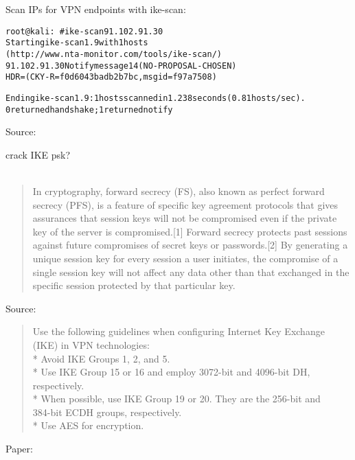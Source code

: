 \documentclass[Screen16to9,17pt]{foils}
\begin{document}
Scan IPs for VPN endpoints with ike-scan:
\begin{alltt}\small
root@kali:~# ike-scan 91.102.91.30
Starting ike-scan 1.9 with 1 hosts
(http://www.nta-monitor.com/tools/ike-scan/)
91.102.91.30	Notify message 14 (NO-PROPOSAL-CHOSEN)
HDR=(CKY-R=f0d6043badb2b7bc, msgid=f97a7508)

Ending ike-scan 1.9: 1 hosts scanned in 1.238 seconds (0.81 hosts/sec).
0 returned handshake; 1 returned notify
\end{alltt}

Source:\\
{\small{}}

crack IKE psk?\\
{\small
{} \\
}



\begin{quote}
In cryptography, forward secrecy (FS), also known as perfect forward secrecy (PFS), is a feature of specific key agreement protocols that gives assurances that session keys will not be compromised even if the private key of the server is compromised.[1] Forward secrecy protects past sessions against future compromises of secret keys or passwords.[2] By generating a unique session key for every session a user initiates, the compromise of a single session key will not affect any data other than that exchanged in the specific session protected by that particular key.
\end{quote}

Source: 




\begin{quote}\small
  Use the following guidelines when configuring Internet Key Exchange (IKE) in VPN technologies:\\
* Avoid IKE Groups 1, 2, and 5.\\
* Use IKE Group 15 or 16 and employ 3072-bit and 4096-bit DH, respectively.\\
* When possible, use IKE Group 19 or 20. They are the 256-bit and \\
384-bit ECDH groups, respectively.\\
* Use AES for encryption.
\end{quote}
Paper:
{\small {}}
\end{document}
